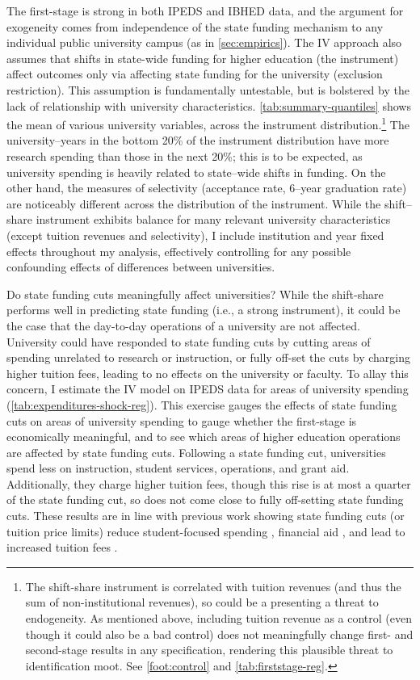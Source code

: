 The first-stage is strong in both IPEDS and IBHED data, and the argument for exogeneity comes from independence of the state funding mechanism to any individual public university campus (as in \autoref{sec:empirics}).
The IV approach also assumes that shifts in state-wide funding for higher education (the instrument) affect outcomes only via affecting state funding for the university (exclusion restriction).
This assumption is fundamentally untestable, but is bolstered by the lack of relationship with university characteristics.
\autoref{tab:summary-quantiles} shows the mean of various university variables, across the instrument distribution.\footnote{
    The shift-share instrument is correlated with tuition revenues (and thus the sum of non-institutional revenues), so could be a presenting a threat to endogeneity.
    As mentioned above, including tuition revenue as a control (even though it could also be a bad control) does not meaningfully change first- and second-stage results in any specification, rendering this plausible threat to identification moot.
    See \autoref{foot:control} and \autoref{tab:firststage-reg}.
}
The university--years in the bottom 20\% of the instrument distribution have more research spending than those in the next 20\%; this is to be expected, as university spending is heavily related to state--wide shifts in funding.
On the other hand, the measures of selectivity (acceptance rate, 6--year graduation rate) are noticeably different across the distribution of the instrument.
While the shift--share instrument exhibits balance for many relevant university characteristics (except tuition revenues and selectivity), I include institution and year fixed effects throughout my analysis, effectively controlling for any possible confounding effects of differences between universities.

Do state funding cuts meaningfully affect universities?
While the shift-share performs well in predicting state funding (i.e., a strong instrument), it could be the case that the day-to-day operations of a university are not affected.
University could have responded to state funding cuts by cutting areas of spending unrelated to research or instruction, or fully off-set the cuts by charging higher tuition fees, leading to no effects on the university or faculty.
To allay this concern, I estimate the IV model on IPEDS data for areas of university spending  (\autoref{tab:expenditures-shock-reg}).
This exercise gauges the effects of state funding cuts on areas of university spending to gauge whether the first-stage is economically meaningful, and to see which areas of higher education operations are affected by state funding cuts.
Following a state funding cut, universities spend less on instruction, student services, operations, and grant aid.
Additionally, they charge higher tuition fees, though this rise is at most a quarter of the state funding cut, so does not come close to fully off-setting state funding cuts.
These results are in line with previous work showing state funding cuts (or tuition price limits) reduce student-focused spending \citep{NBERw23736}, financial aid \citep{miller2022making}, and lead to increased tuition fees \citep{bound2019public}.

